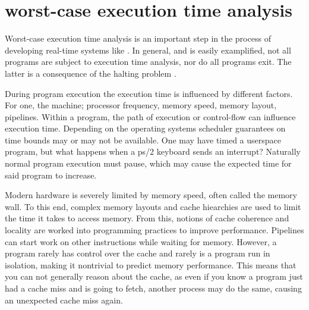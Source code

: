 \section{worst-case execution time analysis}\label{sec:wcet}
Worst-case execution time analysis is an important step in the process of
developing real-time systems\cite{wcet} like \ssdos.
In general, and is easily examplified, not all programs are subject to
execution time analysis, nor do all programs exit.
The latter is a consequence of the halting
problem\cite[ch.~13]{pldi} \cite{wcet}.

During program execution the execution time is influenced by different factors.
For one, the machine; processor frequency, memory speed, memory layout,
pipelines.
Within a program, the path of execution or control-flow can influence
execution time.
Depending on the operating systems scheduler guarantees on time bounds may or
may not be available.
One may have timed a userspace program, but what happens when a ps/2 keyboard
sends an interrupt? Naturally normal program execution must pause, which may
cause the expected time for said program to increase.

Modern hardware is severely limited by memory speed, often called the memory
wall\cite{pcod}. To this end, complex memory layouts and cache hiearchies are
used to limit the time it takes to access memory.
From this, notions of cache coherence and locality are worked into programming
practices to improve performance.
Pipelines can start work on other instructions while waiting for memory.
However, a program rarely has control over the cache and rarely is a program
run in isolation, making it nontrivial to predict memory performance.
This means that you can not generally reason about the cache, as even if you
know a program just had a cache miss and is going to fetch, another process may
do the same, causing an unexpected cache miss again.



